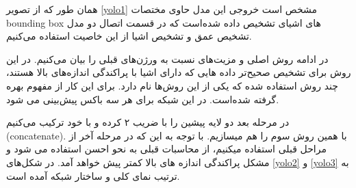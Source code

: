 \documentclass[12pt,a4paper]{report}
\begin{document}
همان طور که از تصویر \ref{yolo1} مشخص است خروجی این مدل حاوی مختصات bounding box های اشیای تشخیص داده شده‌است که در قسمت اتصال دو مدل تشخیص عمق و تشخیص اشیا از این خاصیت استفاده می‌کنیم.

در ادامه روش اصلی و مزیت‌های  نسبت به ورژن‌های قبلی  را بیان می‌کنیم.
در این روش برای تشخیص صحیح‌تر داده هایی که دارای اشیا با پراکندگی اندازه‌های بالا هستند، چند روش استفاده شده که یکی از این روش‌ها  نام دارد. برای این کار از مفهوم  بهره گرفته شده‌است. در این شبکه برای هر  سه باکس پیش‌بینی می شود.

در مرحله بعد  دو لایه پیشین را با ضریب ۲  کرده و با  خود ترکیب می‌کنیم (concatenate). با همین روش  سوم را هم میسازیم. با توجه به این که در مرحله آخر از مراحل قبلی استفاده میکنیم، از محاسبات قبلی به نحو احسن استفاده می شود و مشکل پراکندگی اندازه های بالا کمتر پیش خواهد آمد.
در شکل‌های \ref{yolo2} و \ref{yolo3} به ترتیب نمای کلی و ساختار شبکه  آمده است.
\end{document}
